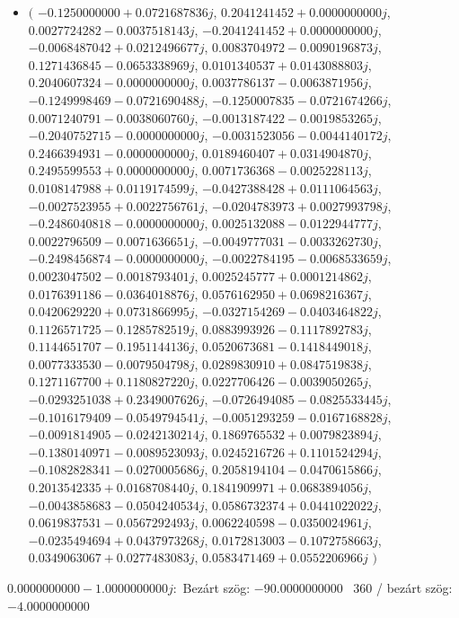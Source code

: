 \documentclass[14pt,a4paper]{article}
\begin{document}
\begin{itemize}
\item
$\big($
$-0.1250000000+0.0721687836j$, $0.2041241452+0.0000000000j$, $0.0027724282-0.0037518143j$, $-0.2041241452+0.0000000000j$, $-0.0068487042+0.0212496677j$, $0.0083704972-0.0090196873j$, $0.1271436845-0.0653338969j$, $0.0101340537+0.0143088803j$, $0.2040607324-0.0000000000j$, $0.0037786137-0.0063871956j$, $-0.1249998469-0.0721690488j$, $-0.1250007835-0.0721674266j$, $0.0071240791-0.0038060760j$, $-0.0013187422-0.0019853265j$, $-0.2040752715-0.0000000000j$, $-0.0031523056-0.0044140172j$, $0.2466394931-0.0000000000j$, $0.0189460407+0.0314904870j$, $0.2495599553+0.0000000000j$, $0.0071736368-0.0025228113j$, $0.0108147988+0.0119174599j$, $-0.0427388428+0.0111064563j$, $-0.0027523955+0.0022756761j$, $-0.0204783973+0.0027993798j$, $-0.2486040818-0.0000000000j$, $0.0025132088-0.0122944777j$, $0.0022796509-0.0071636651j$, $-0.0049777031-0.0033262730j$, $-0.2498456874-0.0000000000j$, $-0.0022784195-0.0068533659j$, $0.0023047502-0.0018793401j$, $0.0025245777+0.0001214862j$, $0.0176391186-0.0364018876j$, $0.0576162950+0.0698216367j$, $0.0420629220+0.0731866995j$, $-0.0327154269-0.0403464822j$, $0.1126571725-0.1285782519j$, $0.0883993926-0.1117892783j$, $0.1144651707-0.1951144136j$, $0.0520673681-0.1418449018j$, $0.0077333530-0.0079504798j$, $0.0289830910+0.0847519838j$, $0.1271167700+0.1180827220j$, $0.0227706426-0.0039050265j$, $-0.0293251038+0.2349007626j$, $-0.0726494085-0.0825533445j$, $-0.1016179409-0.0549794541j$, $-0.0051293259-0.0167168828j$, $-0.0091814905-0.0242130214j$, $0.1869765532+0.0079823894j$, $-0.1380140971-0.0089523093j$, $0.0245216726+0.1101524294j$, $-0.1082828341-0.0270005686j$, $0.2058194104-0.0470615866j$, $0.2013542335+0.0168708440j$, $0.1841909971+0.0683894056j$, $-0.0043858683-0.0504240534j$, $0.0586732374+0.0441022022j$, $0.0619837531-0.0567292493j$, $0.0062240598-0.0350024961j$, $-0.0235494694+0.0437973268j$, $0.0172813003-0.1072758663j$, $0.0349063067+0.0277483083j$, $0.0583471469+0.0552206966j$
$\big)$
\end{itemize}
$0.0000000000-1.0000000000j$:\
Bezárt szög: $-90.0000000000$ \
360 / bezárt szög: $-4.0000000000$\
\end{document}
